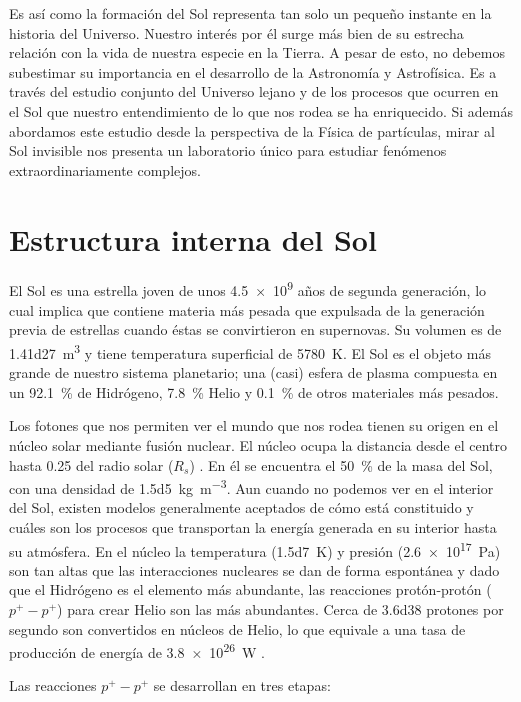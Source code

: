 Es así como la formación del Sol representa tan solo un pequeño instante en la historia del Universo. Nuestro interés por él surge más bien de su estrecha relación con la vida de nuestra especie en la Tierra. A pesar de esto, no debemos subestimar su importancia en el desarrollo de la Astronomía y Astrofísica. Es a través del estudio conjunto del Universo lejano y de los procesos que ocurren en el Sol que nuestro entendimiento de lo que nos rodea se ha enriquecido. Si además abordamos este estudio desde la perspectiva de la Física de partículas, mirar al Sol invisible nos presenta un laboratorio único para estudiar fenómenos extraordinariamente complejos.

\section{Estructura interna del Sol}

El Sol es una estrella joven de unos \num{4.5e9} años de segunda generación, lo cual implica que contiene materia más pesada que expulsada de la generación previa de estrellas cuando éstas se convirtieron en supernovas. Su volumen es de \SI{1.41d27}{\cubic\metre} y tiene temperatura superficial de \SI{5780}{\kelvin}. El Sol es el objeto más grande de nuestro sistema planetario; una (casi) esfera de plasma compuesta en un \SI{92.1}{\percent} de Hidrógeno, \SI{7.8}{\percent} Helio y \SI{0.1}{\percent} de otros materiales más pesados.

Los fotones que nos permiten ver el mundo que nos rodea tienen su origen en el núcleo solar mediante fusión nuclear. El núcleo ocupa la distancia desde el centro hasta \num{0.25} del radio solar ($R_{s}$) \cite{fisica13}. En él se encuentra el \SI{50}{\percent} de la masa del Sol, con una densidad de \SI{1.5d5}{\kilogram\per\cubic\metre}. Aun cuando no podemos ver en el interior del Sol, existen modelos generalmente aceptados de cómo está constituido y cuáles son los procesos que transportan la energía generada en su interior hasta su atmósfera. En el núcleo la temperatura (\SI{1.5d7}{\kelvin}) y presión (\SI{2.6e17}{\pascal}) son tan altas que las interacciones nucleares se dan de forma espontánea y dado que el Hidrógeno es el elemento más abundante, las reacciones protón-protón ($p^{+}-p^{+}$) para crear Helio son las más abundantes. Cerca de \num{3.6d38} protones por segundo son convertidos en núcleos de Helio, lo que equivale a una tasa de producción de energía de \SI{3.8e26}{\watt} \cite{lang09}.

Las reacciones $p^{+}-p^{+}$ se desarrollan en tres etapas:

